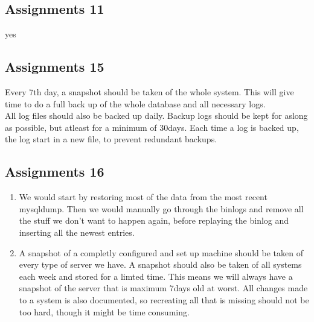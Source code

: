 \subsection{Assignments 11} 
yes

\subsection{Assignments 15}
Every 7th day, a snapshot should be taken of the whole system. This will give time to do a full back up of the whole database and all necessary logs.\\
All log files should also be backed up daily. Backup logs should be kept for aslong as possible, but atleast for a minimum of 30days. Each time a log is backed up, the log start in a new file, to prevent redundant backups.

\subsection{Assignments 16}
\begin{enumerate}
\item We would start by restoring most of the data from the most recent mysqldump. Then we would manually go through the binlogs and remove all the stuff we don't want to happen again, before replaying the binlog and inserting all the newest entries.
\item A snapshot of a completly configured and set up machine should be taken of every type of server we have. A snapshot should also be taken of all systems each week and stored for a limted time. This means we will always have a snapshot of the server that is maximum 7days old at worst. All changes made to a system is also documented, so recreating all that is missing should not be too hard, though it might be time consuming.
\end{enumerate}
